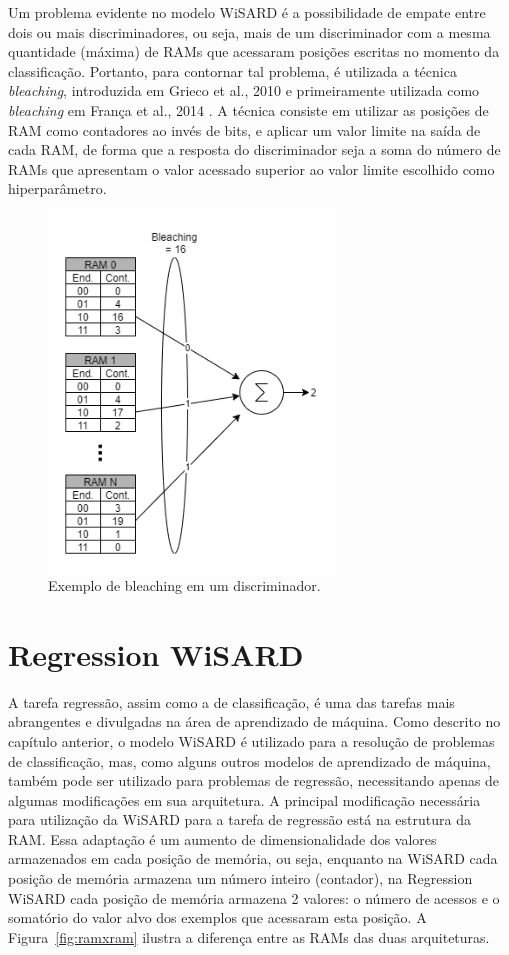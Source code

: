     Um problema evidente no modelo WiSARD é a possibilidade de empate entre dois ou mais discriminadores, ou seja, mais de um discriminador com a mesma quantidade (máxima) de RAMs que acessaram posições escritas no momento da classificação. Portanto, para contornar tal problema, é utilizada a técnica \textit{bleaching}, introduzida em Grieco et al., 2010 \cite{mentalimages} e primeiramente utilizada como \textit{bleaching} em França et al., 2014 \cite{advanceswns}. A técnica consiste em utilizar as posições de RAM como contadores ao invés de bits, e aplicar um valor limite na saída de cada RAM, de forma que a resposta do discriminador seja a soma do número de RAMs que apresentam o valor acessado superior ao valor limite escolhido como hiperparâmetro.

    \begin{figure}[!ht] \label{fig:bleaching}
    \centering
    \includegraphics[width=3.0in]{img/bleaching.png}
    \caption{Exemplo de bleaching em um discriminador.}
    \end{figure}

\section{Regression WiSARD}
    A tarefa regressão, assim como a de classificação, é uma das tarefas mais abrangentes e divulgadas na área de aprendizado de máquina. Como descrito no capítulo anterior, o modelo WiSARD é utilizado para a resolução de problemas de classificação, mas, como alguns outros modelos de aprendizado de máquina, também pode ser utilizado para problemas de regressão, necessitando apenas de algumas modificações em sua arquitetura.
    A principal modificação necessária para utilização da WiSARD para a tarefa de regressão está na estrutura da RAM. Essa adaptação é um aumento de dimensionalidade dos valores armazenados em cada posição de memória, ou seja, enquanto na WiSARD cada posição de memória armazena um número inteiro (contador), na Regression WiSARD cada posição de memória armazena 2 valores: o número de acessos e o somatório do valor alvo dos exemplos que acessaram esta posição. A Figura~\ref{fig:ramxram} ilustra a diferença entre as RAMs das duas arquiteturas.

